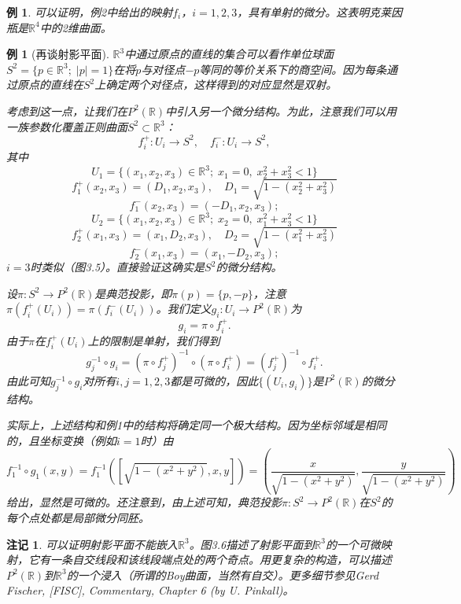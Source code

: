 \documentclass[12pt,a4paper]{ctexbook}
\newtheorem{remark}[theorem]{注记}
\newtheorem{example}[theorem]{例}
\begin{document}
\begin{example}
可以证明，例2中给出的映射$f_i$，$i=1,2,3$，具有单射的微分。这表明克莱因瓶是$\mathbb{R}^4$中的2维曲面。
\end{example}

\begin{example}[再谈射影平面]
$\mathbb{R}^3$中通过原点的直线的集合可以看作单位球面$S^2=\{p\in\mathbb{R}^3;\; |p|=1\}$在将$p$与对径点$-p$等同的等价关系下的商空间。因为每条通过原点的直线在$S^2$上确定两个对径点，这样得到的对应显然是双射。

考虑到这一点，让我们在$P^2(\mathbb{R})$中引入另一个微分结构。为此，注意我们可以用一族参数化覆盖正则曲面$S^2\subset\mathbb{R}^3$：
$$f_i^+:U_i\to S^2,\quad f_i^-:U_i\to S^2,$$
其中
$$U_1 = \{(x_1,x_2,x_3)\in\mathbb{R}^3;\; x_1=0,\; x_2^2+x_3^2<1\}$$
$$f_1^+(x_2,x_3) = (D_1,x_2,x_3),\quad D_1 = \sqrt{1-(x_2^2+x_3^2)}$$
$$f_1^-(x_2,x_3) = (-D_1,x_2,x_3);$$
$$U_2 = \{(x_1,x_2,x_3)\in\mathbb{R}^3;\; x_2=0,\; x_1^2+x_3^2<1\}$$
$$f_2^+(x_1,x_3) = (x_1,D_2,x_3),\quad D_2 = \sqrt{1-(x_1^2+x_3^2)}$$
$$f_2^-(x_1,x_3) = (x_1,-D_2,x_3);$$
$i=3$时类似（图3.5）。直接验证这确实是$S^2$的微分结构。

设$\pi:S^2\to P^2(\mathbb{R})$是典范投影，即$\pi(p)=\{p,-p\}$，注意$\pi(f_i^+(U_i))=\pi(f_i^-(U_i))$。我们定义$g_i:U_i\to P^2(\mathbb{R})$为
$$g_i = \pi\circ f_i^+.$$
由于$\pi$在$f_i^+(U_i)$上的限制是单射，我们得到
$$g_j^{-1}\circ g_i = (\pi\circ f_j^+)^{-1}\circ (\pi\circ f_i^+) = (f_j^+)^{-1}\circ f_i^+.$$
由此可知$g_j^{-1}\circ g_i$对所有$i,j=1,2,3$都是可微的，因此$\{(U_i,g_i)\}$是$P^2(\mathbb{R})$的微分结构。

实际上，上述结构和例1中的结构将确定同一个极大结构。因为坐标邻域是相同的，且坐标变换（例如$i=1$时）由
$$f_1^{-1}\circ g_1(x,y) = f_1^{-1}([\sqrt{1-(x^2+y^2)},x,y]) = \left(\frac{x}{\sqrt{1-(x^2+y^2)}},\frac{y}{\sqrt{1-(x^2+y^2)}}\right)$$
给出，显然是可微的。还注意到，由上述可知，典范投影$\pi:S^2\to P^2(\mathbb{R})$在$S^2$的每个点处都是局部微分同胚。
\end{example}

\begin{remark}
可以证明射影平面不能嵌入$\mathbb{R}^3$。图3.6描述了射影平面到$\mathbb{R}^3$的一个可微映射，它有一条自交线段和该线段端点处的两个奇点。用更复杂的构造，可以描述$P^2(\mathbb{R})$到$\mathbb{R}^3$的一个浸入（所谓的Boy曲面，当然有自交）。更多细节参见Gerd Fischer, [FISC], Commentary, Chapter 6 (by U. Pinkall)。
\end{remark}
\end{document}
